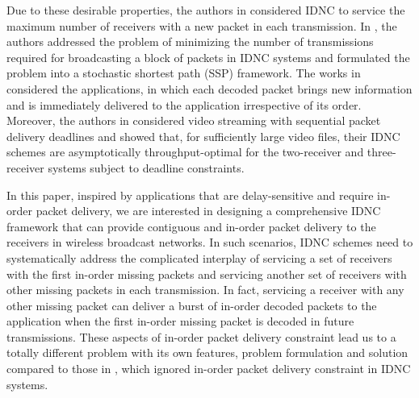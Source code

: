 \documentclass[12pt, peerreview, onecolumn]{IEEEtran}
\begin{document}
Due to these desirable properties, the authors in \cite{sadeghi2010optimal,sorour2010decoding,le2013instantly}   considered IDNC to service the maximum number of receivers with a new packet in each transmission. In \cite{sorour2012completion,aboutorabenabling}, the authors addressed the problem of minimizing
the number of transmissions required for broadcasting a block of packets in IDNC systems and formulated the
problem into a stochastic shortest path (SSP) framework. The works in \cite{sorour2012completion,aboutorabenabling,sadeghi2010optimal,sorour2010decoding,le2013instantly} considered the applications, in which each decoded packet brings new information and  is immediately delivered to the application irrespective of its order.   Moreover, the authors in \cite{li2011capacity}  considered video streaming with sequential packet delivery deadlines and showed that, for sufficiently large video files, their IDNC schemes are asymptotically throughput-optimal for the two-receiver and three-receiver systems subject to deadline constraints.






In this paper, inspired by  applications that are delay-sensitive and require in-order packet delivery, we are interested in designing a comprehensive IDNC framework  that can provide contiguous and in-order packet delivery to the
receivers in wireless broadcast networks. In such scenarios,   IDNC schemes need to systematically address the  complicated   interplay of   servicing a set of receivers with the first in-order missing packets and servicing another set of receivers with  other missing packets in each transmission.  In fact, servicing a receiver with any other missing packet can deliver a burst of in-order decoded packets to the application when the first in-order missing packet is decoded in future transmissions.  These aspects of in-order packet delivery constraint lead us to a totally different problem with its own features, problem formulation and solution compared to those in \cite{sorour2012completion,aboutorabenabling,sadeghi2010optimal,sorour2010decoding,le2013instantly}, which ignored in-order packet delivery constraint in IDNC systems.
\end{document}
